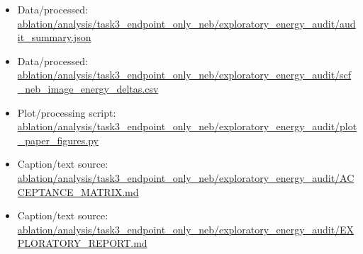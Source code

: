 \begin{itemize}[leftmargin=1.4em,noitemsep]
\item Data/processed: \begingroup\scriptsize\url{ablation/analysis/task3_endpoint_only_neb/exploratory_energy_audit/audit_summary.json}\endgroup
\item Data/processed: \begingroup\scriptsize\url{ablation/analysis/task3_endpoint_only_neb/exploratory_energy_audit/scf_neb_image_energy_deltas.csv}\endgroup
\item Plot/processing script: \begingroup\scriptsize\url{ablation/analysis/task3_endpoint_only_neb/exploratory_energy_audit/plot_paper_figures.py}\endgroup
\item Caption/text source: \begingroup\scriptsize\url{ablation/analysis/task3_endpoint_only_neb/exploratory_energy_audit/ACCEPTANCE_MATRIX.md}\endgroup
\item Caption/text source: \begingroup\scriptsize\url{ablation/analysis/task3_endpoint_only_neb/exploratory_energy_audit/EXPLORATORY_REPORT.md}\endgroup
\end{itemize}
